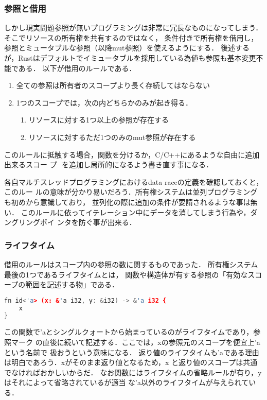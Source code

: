 \subsubsection{参照と借用}
しかし現実問題参照が無いプログラミングは非常に冗長なものになってしまう．
そこでリソースの所有権を共有するのではなく，
条件付きで所有権を借用し，参照とミュータブルな参照（以降mut参照）を使えるようにする．
後述するが，Rustはデフォルトでイミュータブルを採用している為値も参照も基本変更不
能である．
以下が借用のルールである．
\begin{enumerate}
  \item 全ての参照は所有者のスコープより長く存続してはならない
  \item 1つのスコープでは，次の内どちらかのみが起き得る．
    \begin{enumerate}
      \item リソースに対する1つ以上の参照が存在する
      \item リソースに対するただ1つのみのmut参照が存在する
    \end{enumerate}
\end{enumerate}
このルールに抵触する場合，関数を分けるか，C/C++にあるような自由に追加出来るスコー
プ ${}$ を追加し局所的になるよう書き直す事になる．

各自マルチスレッドプログラミングにおけるdata raceの定義を確認しておくと，このルー
ルの意味が分かり易いだろう．所有権システムは並列プログラミングも初めから意識しており，
並列化の際に追加の条件が要請されるような事は無い．
このルールに依ってイテレーション中にデータを消してしまう行為や，ダングリングポイ
ンタを防ぐ事が出来る．

\subsubsection{ライフタイム}
借用のルールはスコープ内の参照の数に関するものであった．
所有権システム最後の1つであるライフタイムとは，
関数や構造体が有する参照の「有効なスコープの範囲を記述する物」である．

\begin{lstlisting}[language={C++},caption=関数のライフタイム,label=lifetime_fn]
fn id<'a> (x: &'a i32, y: &i32) -> &'a i32 {
    x
}
\end{lstlisting}

この関数で'aとシングルクォートから始まっているのがライフタイムであり，参照マーク
の直後に続いて記述する．ここでは，xの参照元のスコープを便宜上'aという名前で
扱おうという意味になる．
返り値のライフタイムも'aである理由は明白であろう．xがそのまま返り値となるため，x
と返り値のスコープは共通でなければおかしいからだ．
なお関数にはライフタイムの省略ルールが有り，yはそれによって省略されているが適当
な'a以外のライフタイムが与えられている．


